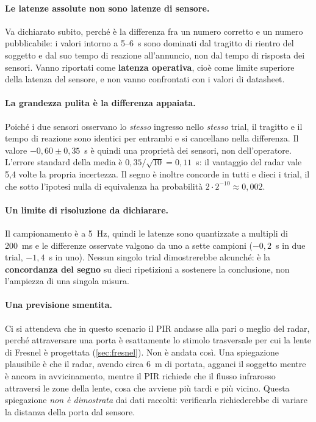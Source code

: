 \paragraph{Le latenze assolute non sono latenze di sensore.} Va dichiarato subito,
perché è la differenza fra un numero corretto e un numero pubblicabile: i valori
intorno a 5--6~s sono dominati dal tragitto di rientro del soggetto e dal suo tempo di
reazione all'annuncio, non dal tempo di risposta dei sensori. Vanno riportati come
\textbf{latenza operativa}, cioè come limite superiore della latenza del sensore, e
non vanno confrontati con i valori di datasheet.

\paragraph{La grandezza pulita è la differenza appaiata.} Poiché i due sensori
osservano lo \emph{stesso} ingresso nello \emph{stesso} trial, il tragitto e il tempo
di reazione sono identici per entrambi e si cancellano nella differenza. Il valore
$-0{,}60 \pm 0{,}35$~s è quindi una proprietà dei sensori, non dell'operatore.
L'errore standard della media è $0{,}35/\sqrt{10} = 0{,}11$~s: il vantaggio del radar
vale 5,4 volte la propria incertezza. Il segno è inoltre concorde in tutti e dieci i
trial, il che sotto l'ipotesi nulla di equivalenza ha probabilità
$2 \cdot 2^{-10} \approx 0{,}002$.

\paragraph{Un limite di risoluzione da dichiarare.} Il campionamento è a 5~Hz, quindi
le latenze sono quantizzate a multipli di 200~ms e le differenze osservate valgono da
uno a sette campioni ($-0{,}2$~s in due trial, $-1{,}4$~s in uno). Nessun singolo
trial dimostrerebbe alcunché: è la \textbf{concordanza del segno} su dieci ripetizioni
a sostenere la conclusione, non l'ampiezza di una singola misura.

\paragraph{Una previsione smentita.} Ci si attendeva che in questo scenario il PIR
andasse alla pari o meglio del radar, perché attraversare una porta è esattamente lo
stimolo trasversale per cui la lente di Fresnel è progettata (\cref{sec:fresnel}).
Non è andata così. Una spiegazione plausibile è che il radar, avendo circa 6~m di
portata, agganci il soggetto mentre è ancora in avvicinamento, mentre il PIR richiede
che il flusso infrarosso attraversi le zone della lente, cosa che avviene più tardi e
più vicino. Questa spiegazione \emph{non è dimostrata} dai dati raccolti:
verificarla richiederebbe di variare la distanza della porta dal sensore.

